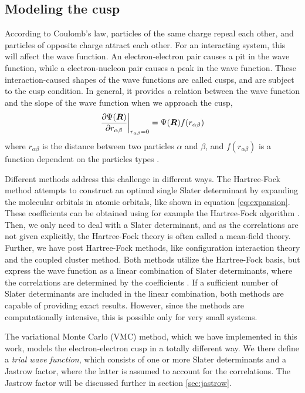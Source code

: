 \subsection{Modeling the cusp} \label{sec:cusp}
According to Coulomb's law, particles of the same charge repeal each other, and particles of opposite charge attract each other. For an interacting system, this will affect the wave function. An electron-electron pair causes a pit in the wave function, while a electron-nucleon pair causes a peak in the wave function. These interaction-caused shapes of the wave functions are called cusps, and are subject to the cusp condition. In general, it provides a relation between the wave function and the slope of the wave function when we approach the cusp,
\begin{equation}
\frac{\partial\Psi(\boldsymbol{{R}})}{\partial r_{\alpha\beta}}\bigg|_{r_{\alpha\beta}=0}=\Psi(\boldsymbol{{R}})f(r_{\alpha\beta})
\end{equation}
where $r_{\alpha\beta}$ is the distance between two particles $\alpha$ and $\beta$, and $f(r_{\alpha\beta})$ is a function dependent on the particles types \supercite{bingel_a_physical_1967}.

Different methods address this challenge in different ways. The Hartree-Fock method attempts to construct an optimal single Slater determinant by expanding the molecular orbitals in atomic orbitals, like shown in equation \eqref{eq:expansion}. These coefficients can be obtained using for example the Hartree-Fock algorithm \supercite{hartree_wave_1928, fock_selfconsistent_1930}. Then, we only need to deal with a Slater determinant, and as the correlations are not given explicitly, the Hartree-Fock theory is often called a mean-field theory. Further, we have post Hartree-Fock methods, like configuration interaction theory and the coupled cluster method. Both methods utilize the Hartree-Fock basis, but express the wave function as a linear combination of Slater determinants, where the correlations are determined by the coefficients \supercite{daniel_crawford_introduction_2007}. If a sufficient number of Slater determinants are included in the linear combination, both methods are capable of providing exact results. However, since the methods are computationally intensive, this is possible only for very small systems.

The variational Monte Carlo (VMC) method, which we have implemented in this work, models the electron-electron cusp in a totally different way. We there define a \textit{trial wave function}, which consists of one or more Slater determinants and a Jastrow factor, where the latter is assumed to account for the correlations. The Jastrow factor will be discussed further in section \ref{sec:jastrow}.

